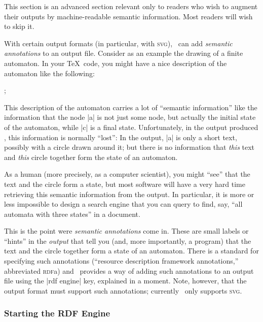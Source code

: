 \label{section-tikz-rdf}

This section is an advanced section relevant only to readers who wish
to augment their outputs by machine-readable semantic
information. Most readers will wish to skip it.

With certain output formats (in particular, with \textsc{svg}),
\tikzname\ can add \emph{semantic annotations} to an output
file. Consider as an example the drawing of a finite automaton. In your
\TeX\ code, you might have a nice description of the automaton like
the following:
\begin{codeexample}
\tikz[automaton] ;
\end{codeexample}
This description of the automaton carries a lot of ``semantic
information'' like the information that the node |a| is not just some
node, but actually the initial state of the automaton, while |c| is a
final state. Unfortunately, in the output produced \tikzname, this
information is normally ``lost'': In the output, |a| is only a short
text, possibly with a circle drawn around it; but there is no
information that \emph{this} text and \emph{this} circle together form
the state of an automaton.

As a human (more precisely, as a computer scientist), you might
``see'' that the text and the circle form a state, but most software
will have a very hard time retrieving this semantic information from the
output. In particular, it is more or less impossible to design a
search engine that you can query to find, say, ``all automata with
three states'' in a document.

This is the point were \emph{semantic annotations} come in. These are
small labels or ``hints'' in the \emph{output} that tell you (and,
more importantly, a program) that the text and the circle together
form a state of an automaton. There is a standard for specifying such
annotations (``resource description framework annotations,''
abbreviated \textsc{rdf}a) and \tikzname\ provides a way of
adding such annotations to an output file using the |rdf engine| key,
explained in a moment. Note, however, that the output format must
support such annotations; currently \tikzname\ only supports
\textsc{svg}.


\subsubsection{Starting the RDF Engine}

